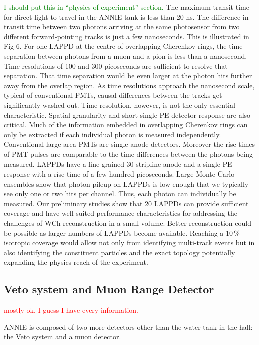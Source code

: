  {\textcolor{green}{I should put this in ``physics of experiment'' section.}
 \color{blue}
 The maximum transit time for direct light to travel in the ANNIE tank is less than 20 ns.
 The difference in transit time between two photons arriving at the same photosensor from two %
 different forward-pointing tracks is just a few nanoseconds. 
 This is illustrated in Fig 6. 
 For one LAPPD at the centre of overlapping Cherenkov rings, the time separation between photons %
 from a muon and a pion is less than a nanosecond. 
 Time resolutions of 100 and 300 picoseconds are sufficient to resolve that separation. 
 That time separation would be even larger at the photon hits further away from the overlap region. 
 As time resolutions approach the nanosecond scale, typical of conventional PMTs, %
 causal differences between the tracks get significantly washed out.
 Time resolution, however, is not the only essential characteristic. 
 Spatial granularity and short single-PE detector response are also critical.
 Much of the information embedded in overlapping Cherenkov rings can only be extracted %
 if each individual photon is measured independently.
 Conventional large area PMTs are single anode detectors. 
 Moreover the rise times of PMT pulses are comparable to the time differences between %
 the photons being measured. 
 LAPPDs have a fine-grained 30 stripline anode and a single PE response with a rise time %
 of a few hundred picoseconds.
 Large Monte Carlo ensembles show that photon pileup on LAPPDs is low enough that we typically %
 see only one or two hits per channel. 
 Thus, each photon can individually be measured.
 Our preliminary studies show that 20 LAPPDs can provide sufficient coverage and have well-suited %
 performance characteristics for addressing the challenges of WCh reconstruction in a small volume. 
 Better reconstruction could be possible as larger numbers of LAPPDs become available.
 Reaching a 10\,\% isotropic coverage would allow not only from identifying multi-track %
 events but in also identifying the constituent particles and the exact topology potentially %
 expanding the physics reach of the experiment.}

 \subsection[Veto and MRD]{Veto system and Muon Range Detector}
 \label{2.3}
 \textcolor{red}{mostly ok, I guess I have every information.}

 ANNIE is composed of two more detectors other than the water tank in the hall: the Veto system %
 and a muon detector.

